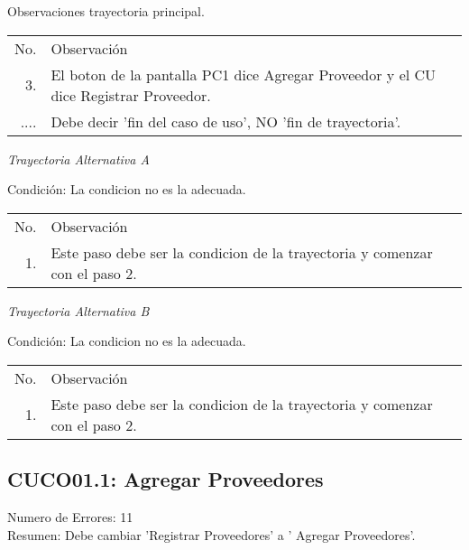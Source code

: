 \documentclass[10pt,spanish]{article}
\providecommand{\tabularnewline}{\\}
\begin{document}
Observaciones trayectoria principal. %
\begin{longtable}{rp{8cm}}
No.  & Observación\tabularnewline
3. & El boton de la pantalla PC1 dice Agregar Proveedor y el CU dice Registrar Proveedor.\tabularnewline
....  &  Debe decir 'fin del caso de uso', NO 'fin de trayectoria'.\tabularnewline
\end{longtable}

\textit{Trayectoria Alternativa A}

Condición: La condicion no es la adecuada.

\begin{longtable}{rp{8cm}}
No.  & Observación\tabularnewline
1.  & Este paso debe ser la condicion de la trayectoria y comenzar con el paso 2.\tabularnewline
\end{longtable}

\textit{Trayectoria Alternativa B}

Condición: La condicion no es la adecuada.

\begin{longtable}{rp{8cm}}
No.  & Observación\tabularnewline
1.  & Este paso debe ser la condicion de la trayectoria y comenzar con el paso 2.\tabularnewline
\end{longtable}%
\newpage{}


\subsection{CUCO01.1: Agregar Proveedores}
Numero de Errores: 11\tabularnewline
Resumen: Debe cambiar 'Registrar Proveedores' a ' Agregar Proveedores'.

\end{document}
